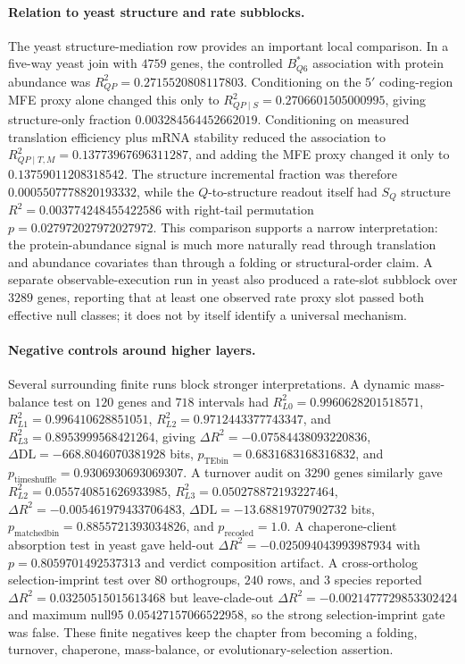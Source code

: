 \paragraph{Relation to yeast structure and rate subblocks.}
The yeast structure-mediation row provides an important local comparison.  In a five-way yeast join with $4759$ genes, the controlled $B^{\ast}_{Q6}$ association with protein abundance was $R^2_{QP}=0.2715520808117803$.  Conditioning on the $5'$ coding-region MFE proxy alone changed this only to $R^2_{QP\mid S}=0.2706601505000995$, giving structure-only fraction $0.003284564452662019$.  Conditioning on measured translation efficiency plus mRNA stability reduced the association to $R^2_{QP\mid T,M}=0.13773967696311287$, and adding the MFE proxy changed it only to $0.13759011208318542$.  The structure incremental fraction was therefore $0.0005507778820193332$, while the $Q$-to-structure readout itself had $S_Q$ structure $R^2=0.003774248455422586$ with right-tail permutation $p=0.027972027972027972$.  This comparison supports a narrow interpretation: the protein-abundance signal is much more naturally read through translation and abundance covariates than through a folding or structural-order claim.  A separate observable-execution run in yeast also produced a rate-slot subblock over $3289$ genes, reporting that at least one observed rate proxy slot passed both effective null classes; it does not by itself identify a universal mechanism.

\paragraph{Negative controls around higher layers.}
Several surrounding finite runs block stronger interpretations.  A dynamic mass-balance test on $120$ genes and $718$ intervals had $R^2_{L0}=0.9960628201518571$, $R^2_{L1}=0.996410628851051$, $R^2_{L2}=0.9712443377743347$, and $R^2_{L3}=0.8953999568421264$, giving $\Delta R^2=-0.07584438093220836$, $\Delta\mathrm{DL}=-668.8046070381928$ bits, $p_{\mathrm{TEbin}}=0.6831683168316832$, and $p_{\mathrm{timeshuffle}}=0.9306930693069307$.  A turnover audit on $3290$ genes similarly gave $R^2_{L2}=0.055740851626933985$, $R^2_{L3}=0.050278872193227464$, $\Delta R^2=-0.005461979433706483$, $\Delta\mathrm{DL}=-13.68819707902732$ bits, $p_{\mathrm{matchedbin}}=0.8855721393034826$, and $p_{\mathrm{recoded}}=1.0$.  A chaperone-client absorption test in yeast gave held-out $\Delta R^2=-0.025094043993987934$ with $p=0.8059701492537313$ and verdict composition artifact.  A cross-ortholog selection-imprint test over $80$ orthogroups, $240$ rows, and $3$ species reported $\Delta R^2=0.03250515015613468$ but leave-clade-out $\Delta R^2=-0.0021477729853302424$ and maximum null95 $0.05427157066522958$, so the strong selection-imprint gate was false.  These finite negatives keep the chapter from becoming a folding, turnover, chaperone, mass-balance, or evolutionary-selection assertion.

